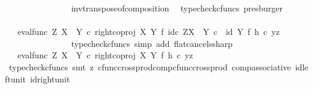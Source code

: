 \begin{isabellebody}
\ \ \ \ \ \ \ \ \ \ \ \ \ \ \isamarkupfalse%
\ inv{\isacharunderscore}{\kern0pt}transpose{\isacharunderscore}{\kern0pt}of{\isacharunderscore}{\kern0pt}composition\ \isamarkupfalse%
\ {\isacharparenleft}{\kern0pt}typecheck{\isacharunderscore}{\kern0pt}cfuncs{\isacharcomma}{\kern0pt}\ presburger{\isacharparenright}{\kern0pt}\isanewline
\ \ \ \ \ \ \ \ \ \ \ \ \isamarkupfalse%
\ \isamarkupfalse%
\ {\isachardoublequoteopen}{\isachardot}{\kern0pt}{\isachardot}{\kern0pt}{\isachardot}{\kern0pt}\ {\isacharequal}{\kern0pt}\ {\isacharparenleft}{\kern0pt}{\isacharparenleft}{\kern0pt}eval{\isacharunderscore}{\kern0pt}func\ Z\ {\isacharparenleft}{\kern0pt}X\ {\isasymCoprod}\ Y{\isacharparenright}{\kern0pt}\ {\isasymcirc}\isactrlsub c\ right{\isacharunderscore}{\kern0pt}coproj\ X\ Y\ {\isasymtimes}\isactrlsub f\ id\isactrlsub c\ {\isacharparenleft}{\kern0pt}Z\isactrlbsup {\isacharparenleft}{\kern0pt}X\ {\isasymCoprod}\ Y{\isacharparenright}{\kern0pt}\isactrlesup {\isacharparenright}{\kern0pt}{\isacharparenright}{\kern0pt}\ {\isasymcirc}\isactrlsub c\ \ {\isacharparenleft}{\kern0pt}id\ Y\ {\isasymtimes}\isactrlsub f\ h{\isacharparenright}{\kern0pt}{\isacharparenright}{\kern0pt}\ {\isasymcirc}\isactrlsub c\ {\isasymlangle}y{\isacharcomma}{\kern0pt}z{\isasymrangle}{\isachardoublequoteclose}\isanewline
\ \ \ \ \ \ \ \ \ \ \ \ \ \ \isamarkupfalse%
\ {\isacharparenleft}{\kern0pt}typecheck{\isacharunderscore}{\kern0pt}cfuncs{\isacharcomma}{\kern0pt}\ simp\ add{\isacharcolon}{\kern0pt}\ flat{\isacharunderscore}{\kern0pt}cancels{\isacharunderscore}{\kern0pt}sharp{\isacharparenright}{\kern0pt}\isanewline
\ \ \ \ \ \ \ \ \ \ \ \ \isamarkupfalse%
\ \isamarkupfalse%
\ {\isachardoublequoteopen}{\isachardot}{\kern0pt}{\isachardot}{\kern0pt}{\isachardot}{\kern0pt}\ {\isacharequal}{\kern0pt}\ {\isacharparenleft}{\kern0pt}eval{\isacharunderscore}{\kern0pt}func\ Z\ {\isacharparenleft}{\kern0pt}X\ {\isasymCoprod}\ Y{\isacharparenright}{\kern0pt}\ {\isasymcirc}\isactrlsub c\ right{\isacharunderscore}{\kern0pt}coproj\ X\ Y\ {\isasymtimes}\isactrlsub f\ h{\isacharparenright}{\kern0pt}\ {\isasymcirc}\isactrlsub c\ {\isasymlangle}y{\isacharcomma}{\kern0pt}z{\isasymrangle}{\isachardoublequoteclose}\isanewline
\ \ \ \ \ \ \ \ \ \ \ \ \ \ \isamarkupfalse%
\ {\isacharparenleft}{\kern0pt}typecheck{\isacharunderscore}{\kern0pt}cfuncs{\isacharcomma}{\kern0pt}\ smt\ {\isacharparenleft}{\kern0pt}z{}{\isacharparenright}{\kern0pt}\ cfunc{\isacharunderscore}{\kern0pt}cross{\isacharunderscore}{\kern0pt}prod{\isacharunderscore}{\kern0pt}comp{\isacharunderscore}{\kern0pt}cfunc{\isacharunderscore}{\kern0pt}cross{\isacharunderscore}{\kern0pt}prod\ comp{\isacharunderscore}{\kern0pt}associative{}\ id{\isacharunderscore}{\kern0pt}left{\isacharunderscore}{\kern0pt}unit{}\ id{\isacharunderscore}{\kern0pt}right{\isacharunderscore}{\kern0pt}unit{}{\isacharparenright}{\kern0pt}\isanewline

\end{isabellebody}
